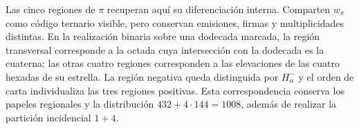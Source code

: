 Las cinco regiones de $\pi$ recuperan aquí su diferenciación interna.
Comparten $w_\pi$ como código ternario visible, pero conservan emisiones,
firmas y multiplicidades distintas. En la realización binaria sobre una
dodecada marcada, la región transversal corresponde a la octada cuya
intersección con la dodecada es la cuaterna; las otras cuatro regiones
corresponden a las elevaciones de las cuatro hexadas de su estrella. La
región negativa queda distinguida por $H^-_\alpha$ y el orden de carta
individualiza las tres regiones positivas. Esta correspondencia conserva
los papeles regionales y la distribución $432+4\cdot144=1008$, además
de realizar la partición incidencial $1+4$.
